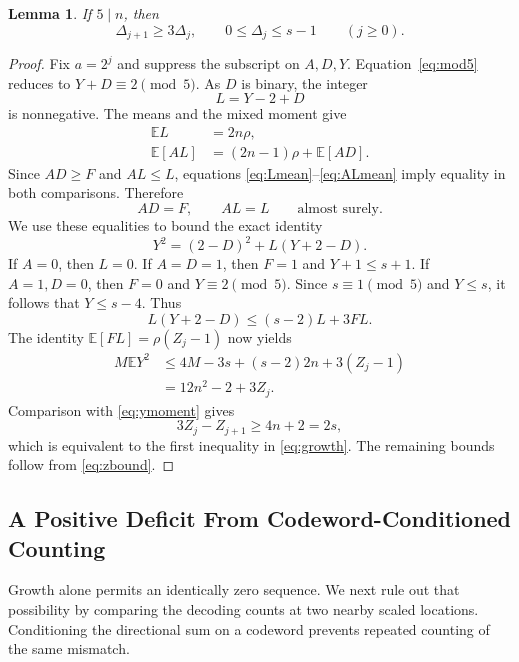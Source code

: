 \documentclass[12pt,letterpaper,onecolumn]{article}
\newtheorem{lemma}[theorem]{Lemma}
\theoremstyle{definition}
\newcommand{\E}{\mathbb{E}}
\begin{document}
\begin{lemma}\label{lem:growth}
If $5\mid n$, then
\begin{equation}\label{eq:growth}
 \Delta_{j+1}\ge3\Delta_j,\qquad0\le\Delta_j\le s-1
 \qquad(j\ge0).
\end{equation}
\end{lemma}
\begin{proof}
Fix $a=2^j$ and suppress the subscript on $A,D,Y$. Equation~\eqref{eq:mod5} reduces to $Y+D\equiv2\pmod5$. As $D$ is binary, the integer
\[
 L=Y-2+D
\]
is nonnegative. The means and the mixed moment give
\begin{align}
 \E L&=2n\rho,\label{eq:Lmean}\\
 \E[AL]&=(2n-1)\rho+\E[AD].\label{eq:ALmean}
\end{align}
Since $AD\ge F$ and $AL\le L$, equations \eqref{eq:Lmean}--\eqref{eq:ALmean} imply equality in both comparisons. Therefore
\begin{equation}\label{eq:saturation}
 AD=F,\qquad AL=L\qquad\text{almost surely}.
\end{equation}
We use these equalities to bound the exact identity
\[
 Y^2=(2-D)^2+L(Y+2-D).
\]
If $A=0$, then $L=0$. If $A=D=1$, then $F=1$ and $Y+1\le s+1$. If $A=1,D=0$, then $F=0$ and $Y\equiv2\pmod5$. Since $s\equiv1\pmod5$ and $Y\le s$, it follows that $Y\le s-4$. Thus
\begin{equation}\label{eq:integer-upper}
 L(Y+2-D)\le(s-2)L+3FL.
\end{equation}
The identity $\E[FL]=\rho(Z_j-1)$ now yields
\begin{align}\label{eq:second-upper}
 M\E Y^2
 &\le4M-3s+(s-2)2n+3(Z_j-1)\nonumber\\
 &=12n^2-2+3Z_j.
\end{align}
Comparison with \eqref{eq:ymoment} gives
\[
 3Z_j-Z_{j+1}\ge4n+2=2s,
\]
which is equivalent to the first inequality in \eqref{eq:growth}. The remaining bounds follow from \eqref{eq:zbound}.
\end{proof}

\subsection{A Positive Deficit From Codeword-Conditioned Counting}
Growth alone permits an identically zero sequence. We next rule out that possibility by comparing the decoding counts at two nearby scaled locations. Conditioning the directional sum on a codeword prevents repeated counting of the same mismatch.
\end{document}
